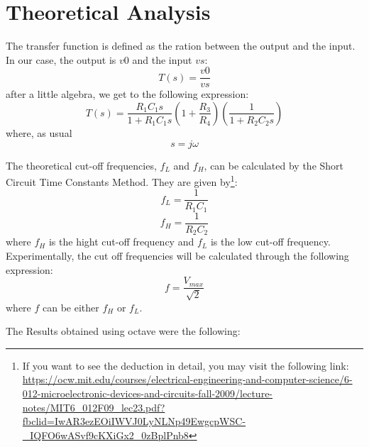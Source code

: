\section{Theoretical Analysis}
\label{sec:analysis}



The transfer function is defined as the ration between the output and the input. In our case, the output is $v0$ and the input $vs$:
\begin{equation*}
    T(s)=\frac{v0}{vs}
\end{equation*}
after a little algebra, we get to the following expression:
\begin{equation}
    T(s)=\frac{R_{1}C_{1}s}{1+R_{1}C_{1}s} (1 + \frac{R_{3}}{R_4}) (\frac{1}{1+ R_{2} C_{2}s}) 
\end{equation}
where, as usual
\begin{equation*}
    s = j\omega
\end{equation*}


The theoretical cut-off frequencies, $f_L$ and $f_H$, can be calculated by the Short Circuit Time Constants Method. They are given by\footnote{If you want to see the deduction in detail, you may visit the following link: \url{https://ocw.mit.edu/courses/electrical-engineering-and-computer-science/6-012-microelectronic-devices-and-circuits-fall-2009/lecture-notes/MIT6_012F09_lec23.pdf?fbclid=IwAR3ezEOiIWVJ0LyNLNp49EwgcpWSC-_IQFO6wASvf9cKXiGx2_0zBplPnb8}}:
\begin{equation}
    f_L = \frac{1}{R_1C_1}
\end{equation}
\begin{equation}
    f_H = \frac{1}{R_2C_2}
\end{equation}
where $f_H$ is the hight cut-off frequency and $f_L$ is the low cut-off frequency.
Experimentally, the cut off frequencies will be calculated through the following expression:
\begin{equation*}
    f = \frac{V_{max}}{\sqrt{2}}
\end{equation*}
where $f$ can be either $f_H$ or $f_L$.


The Results obtained using octave were the following:

